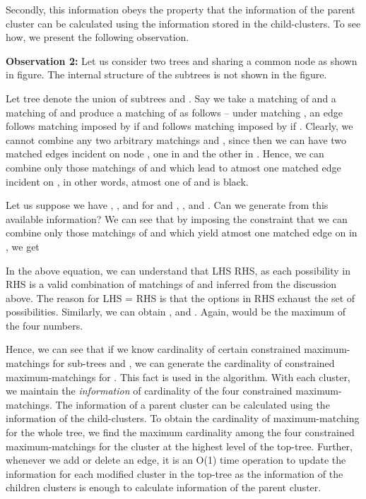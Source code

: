 \documentclass[a4paper,12pt]{article}
\begin{document}
Secondly, this information obeys the property that the information of the parent cluster can be calculated using the information stored in the child-clusters. To see how, we present the following observation.


{\bf Observation 2:} Let us consider two trees  and  sharing a common node  as shown in figure. The internal structure of the subtrees is not shown in the figure. 


Let tree  denote the union of subtrees  and . Say we take a matching  of  and a matching  of  and produce a matching  of  as follows -- under matching , an edge  follows matching imposed by  if  and follows matching imposed by  if . Clearly, we cannot combine any two arbitrary matchings  and , since then we can have two matched edges incident on node , one in  and the other in . Hence, we can combine only those matchings of  and  which lead to atmost one matched edge incident on , in other words, atmost one of  and  is black.

Let us suppose we have , ,  and  for  and , ,  and . Can we generate  from this available information? We can see that by imposing the constraint that we can combine only those matchings of  and  which yield atmost one matched edge on  in , we get


In the above equation, we can understand that LHS  RHS, as each possibility in RHS is a valid combination of matchings of  and  inferred from the discussion above. The reason for LHS = RHS is that the options in RHS exhaust the set of possibilities. Similarly, we can obtain ,  and . Again,  would be the maximum of the four numbers.

Hence, we can see that if we know cardinality of certain constrained maximum-matchings for sub-trees  and , we can generate the cardinality of constrained maximum-matchings for . This fact is used in the algorithm. With each cluster, we maintain the {\em information} of cardinality of the four constrained maximum-matchings. The information of a parent cluster can be calculated using the information of the child-clusters. To obtain the cardinality of maximum-matching for the whole tree, we find the maximum cardinality among the four constrained maximum-matchings for the cluster at the highest level of the top-tree. Further, whenever we add or delete an edge, it is an O(1) time operation to update the information for each modified cluster in the top-tree as the information of the children clusters is enough to calculate information of the parent cluster.
\end{document}
